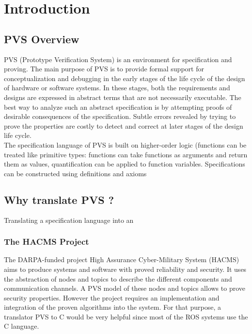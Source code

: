 \documentclass[12pt,a4paper]{article}
\begin{document}
\newpage
\tableofcontents
\newpage

\section{Introduction}


\subsection{PVS Overview}

PVS  (Prototype Verification System) is an environment for specification and proving. The main purpose of PVS is to provide formal support for conceptualization and debugging in the early stages of the life cycle of the design of hardware or software systems. In these stages, both the requirements and designs are expressed in abstract terms that are not necessarily executable. The best way to analyze such an abstract specification is by attempting proofs of desirable consequences of the specification. Subtle errors revealed by trying to prove the properties are costly to detect and correct at later stages of the design life cycle. \\

The specification language of PVS is built on higher-order logic (functions can be treated like primitive types: functions can take functions as arguments and return them as values, quantification can be applied to function variables. Specifications can be constructed using definitions and axioms





\subsection{Why translate PVS ?}

Translating a specification language into an 

\subsubsection*{The HACMS Project}

The DARPA-funded project High Assurance Cyber-Military System (HACMS) aims to produce systems and software with proved reliability and security. It uses the abstraction of nodes and topics to describe the different components and communication
channels. A PVS model of these nodes and topics allows to prove security properties. However the project requires an implementation and integration of the proven algorithms into the system. For that purpose, a translator PVS to C would be very helpful since most of the ROS systems use the C language.
\end{document}
